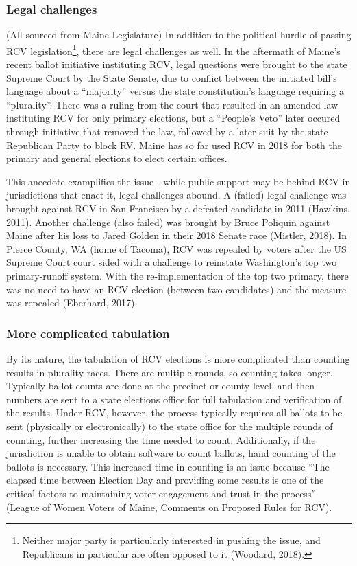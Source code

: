 \documentclass[12pt,twoside]{reedthesis}
\theoremstyle{definition}
\theoremstyle{definition}
\theoremstyle{definition}
\theoremstyle{remark}
\begin{document}
\hypertarget{legal-challenges}{%
\subsubsection{Legal challenges}\label{legal-challenges}}

(All sourced from Maine Legislature) In addition to the political hurdle
of passing RCV legislation\footnote{Neither major party is particularly
  interested in pushing the issue, and Republicans in particular are
  often opposed to it (Woodard, 2018).}, there are legal challenges as
well. In the aftermath of Maine's recent ballot initiative instituting
RCV, legal questions were brought to the state Supreme Court by the
State Senate, due to conflict between the initiated bill's language
about a ``majority'' versus the state constitution's language requiring
a ``plurality''. There was a ruling from the court that resulted in an
amended law instituting RCV for only primary elections, but a ``People's
Veto'' later occured through initiative that removed the law, followed
by a later suit by the state Republican Party to block RV. Maine has so
far used RCV in 2018 for both the primary and general elections to elect
certain offices.

This anecdote examplifies the issue - while public support may be behind
RCV in jurisdictions that enact it, legal challenges abound. A (failed)
legal challenge was brought against RCV in San Francisco by a defeated
candidate in 2011 (Hawkins, 2011). Another challenge (also failed) was
brought by Bruce Poliquin against Maine after his loss to Jared Golden
in their 2018 Senate race (Mistler, 2018). In Pierce County, WA (home of
Tacoma), RCV was repealed by voters after the US Supreme Court court
sided with a challenge to reinstate Washington's top two primary-runoff
system. With the re-implementation of the top two primary, there was no
need to have an RCV election (between two candidates) and the measure
was repealed (Eberhard, 2017).

\hypertarget{more-complicated-tabulation}{%
\subsubsection{More complicated
tabulation}\label{more-complicated-tabulation}}

By its nature, the tabulation of RCV elections is more complicated than
counting results in plurality races. There are multiple rounds, so
counting takes longer. Typically ballot counts are done at the precinct
or county level, and then numbers are sent to a state elections office
for full tabulation and verification of the results. Under RCV, however,
the process typically requires all ballots to be sent (physically or
electronically) to the state office for the multiple rounds of counting,
further increasing the time needed to count. Additionally, if the
jurisdiction is unable to obtain software to count ballots, hand
counting of the ballots is necessary. This increased time in counting is
an issue because ``The elapsed time between Election Day and providing
some results is one of the critical factors to maintaining voter
engagement and trust in the process'' (League of Women Voters of Maine,
Comments on Proposed Rules for RCV).
\end{document}
